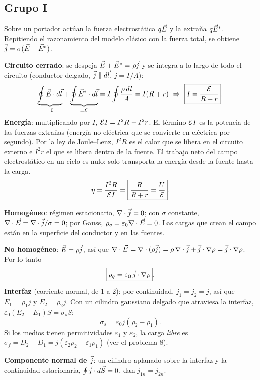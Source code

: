 
\subsection*{Grupo I}
Sobre un portador actúan la fuerza electrostática $q\vec{E}$ y la extraña $q\vec{E}^*$. Repitiendo el razonamiento del modelo clásico con la fuerza total, se obtiene $\vec{j}=\sigma(\vec{E}+\vec{E}^*)$.

\textbf{Circuito cerrado}: se despeja $\vec{E}+\vec{E}^*=\rho\vec{j}$ y se integra a lo largo de todo el circuito (conductor delgado, $\vec{j}\parallel d\vec l$, $j=I/A$):
\[
\underbrace{\oint\vE\cdot d\vec l}_{=0}+\underbrace{\oint\vE^*\cdot d\vec l}_{=\fem}=I\oint\frac{\rho\,dl}{A}=I(R+r)\ \Rightarrow\ \boxed{I=\frac{\fem}{R+r}}.
\]
\textbf{Energía}: multiplicando por $I$, $\mathcal{E} I=I^2R+I^2r$. El término $\mathcal{E} I$ es la potencia de las fuerzas extrañas (energía no eléctrica que se convierte en eléctrica por segundo). Por la ley de Joule--Lenz, $I^2R$ es el calor que se libera en el circuito externo e $I^2r$ el que se libera dentro de la fuente. El trabajo neto del campo electrostático en un ciclo es nulo: solo transporta la energía desde la fuente hasta la carga.
\[
\eta=\frac{I^2R}{\mathcal{E} I}=\boxed{\frac{R}{R+r}=\frac{U}{\mathcal{E}}}.
\]

\textbf{Homogéneo}: régimen estacionario, $\nabla\cdot\vec{j}=0$; con $\sigma$ constante, $\nabla\cdot\vec{E}=\nabla\cdot\vec{j}/\sigma=0$; por Gauss, $\rho_q=\varepsilon_0\nabla\cdot\vec{E}=0$. Las cargas que crean el campo están en la superficie del conductor y en las fuentes.

\textbf{No homogéneo}: $\vec{E}=\rho\vec{j}$, así que $\nabla\cdot\vec{E}=\nabla\cdot(\rho\vec{j})=\rho\,\nabla\cdot\vec{j}+\vec{j}\cdot\nabla\rho=\vec{j}\cdot\nabla\rho$. Por lo tanto
\[
\boxed{\rho_q=\varepsilon_0\,\vec{j}\cdot\nabla\rho}.
\]
\textbf{Interfaz} (corriente normal, de 1 a 2): por continuidad, $j_1=j_2=j$, así que $E_1=\rho_1j$ y $E_2=\rho_2j$. Con un cilindro gaussiano delgado que atraviesa la interfaz, $\varepsilon_0(E_2-E_1)S=\sigma_sS$:
\[
\boxed{\sigma_s=\varepsilon_0 j(\rho_2-\rho_1)}.
\]
Si los medios tienen permitividades $\varepsilon_1$ y $\varepsilon_2$, la carga \emph{libre} es $\sigma_f=D_2-D_1=j(\varepsilon_2\rho_2-\varepsilon_1\rho_1)$ (ver el problema 8).

\textbf{Componente normal de $\vec{j}$}: un cilindro aplanado sobre la interfaz y la continuidad estacionaria, $\oint\vec{j}\cdot d\vec S=0$, dan $j_{1n}=j_{2n}$.

